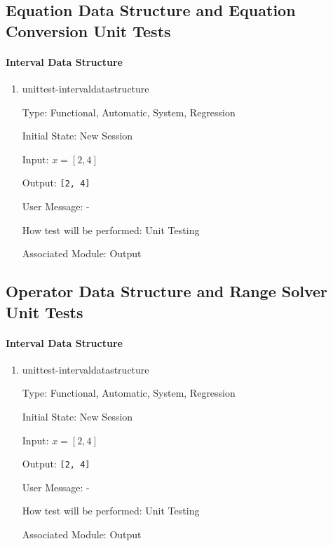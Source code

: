 \documentclass[12pt, titlepage]{article}
\begin{document}
\subsection{Equation Data Structure and Equation Conversion Unit Tests}

\paragraph{Interval Data Structure}
\begin{enumerate}
	
	\item{unittest-intervaldatastructure}
	
	Type: Functional, Automatic, System, Regression
	
	Initial State: New Session
	
	Input: $x = [2,4]$
	
	Output: \texttt{[2, 4]}
	
	User Message: - 
	
	How test will be performed: Unit Testing
	
	Associated Module: Output\\
	
\end{enumerate}

\subsection{Operator Data Structure and Range Solver Unit Tests}

\paragraph{Interval Data Structure}
\begin{enumerate}
	
	\item{unittest-intervaldatastructure}
	
	Type: Functional, Automatic, System, Regression
	
	Initial State: New Session
	
	Input: $x = [2,4]$
	
	Output: \texttt{[2, 4]}
	
	User Message: - 
	
	How test will be performed: Unit Testing
	
	Associated Module: Output\\
	
\end{enumerate}
\end{document}
